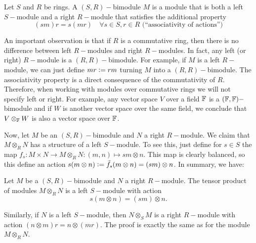 \begin{dang}
    \begin{definition}\cite{curtis1966representation}\label{Definition: definition 1.1.15}
        Let $S$ and $R$ be rings. A $(S,R)-$bimodule $M$ is a module that is both a left $S-$module and a right $R-$module that satisfies the additional property 
        \begin{equation}
            (sm)r = s(mr)\quad\forall s\in S, r\in R \text{ (``associativity of actions'')}
        \end{equation}
    \end{definition}
\end{dang}
An important observation is that if $R$ is a commutative ring, then there is no difference between left $R-$modules and right $R-$modules. In fact, any left (or right) $R-$module is a $(R,R)-$bimodule. For example, if $M$ is a left $R-$module, we can just define $mr\bydef rm$ turning $M$ into a $(R,R)-$bimodule. The associativity property is a direct consequence of the commutativity of $R$. Therefore, when working with modules over commutative rings we will not specify left or right. For example, any vector space $V$ over a field $\mathbb{F}$ is a $(\mathbb{F},\mathbb{F})-$bimodule and if $W$ is another vector space over the same field, we conclude that $V\otimes_{\mathbb{F}} W$ is also a vector space over $\mathbb{F}$.\par
Now, let $M$ be an $(S,R)-$bimodule and $N$ a right $R-$module. We claim that $M\otimes_RN$ has a structure of a left $S-$module. To see this, just define for $s\in S$ the map $f_s: M\times N\rightarrow M\otimes_RN:(m,n)\mapsto sm\otimes n$. This map is clearly balanced, so this define an action $s(m\otimes n)\bydef \Tilde{f_s}(m\otimes n)=(sm)\otimes n$. 
In summary, we have:
\begin{dang}
    \begin{theorem}\cite{curtis1966representation}
        Let $M$ be a $(S,R)-$bimodule and $N$ a right $R-$module. The tensor product of modules $M\otimes_R N$ is a left $S-$module with action
        \begin{equation}
            s(m\otimes n)=(sm)\otimes n.
        \end{equation}
    \end{theorem}
\end{dang}
 Similarly, if $N$ is a left $S-$module, then $N\otimes_S M$ is a right $R-$module with action $(n\otimes m)r=n\otimes(mr)$. The proof is exactly the same as for the module $M\otimes_R N$.\par
